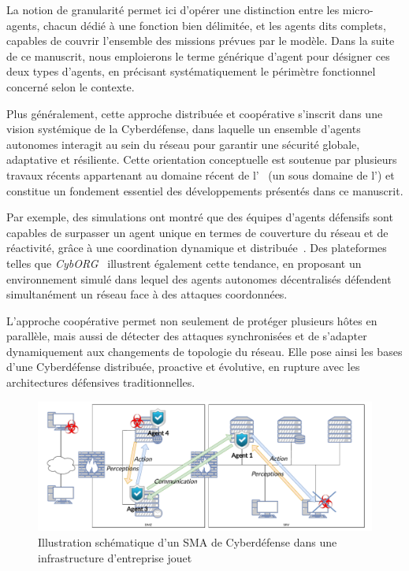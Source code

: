 La notion de granularité permet ici d'opérer une distinction entre les micro-agents, chacun dédié à une fonction bien délimitée, et les agents  dits complets, capables de couvrir l'ensemble des missions prévues par le modèle. Dans la suite de ce manuscrit, nous emploierons le terme générique d'agent  pour désigner ces deux types d'agents, en précisant systématiquement le périmètre fonctionnel concerné selon le contexte.

Plus généralement, cette approche distribuée et coopérative s'inscrit dans une vision systémique de la Cyberdéfense, dans laquelle un ensemble d'agents autonomes interagit au sein du réseau pour garantir une sécurité globale, adaptative et résiliente. Cette orientation conceptuelle est soutenue par plusieurs travaux récents appartenant au domaine récent de l'~\cite{Vyas2023} (un sous domaine de l') et constitue un fondement essentiel des développements présentés dans ce manuscrit.


Par exemple, des simulations ont montré que des équipes d'agents défensifs sont capables de surpasser un agent unique en termes de couverture du réseau et de réactivité, grâce à une coordination dynamique et distribuée~\cite{RLResilientCyberdefense2024}.
Des plateformes telles que \textit{CybORG}~\cite{cage_challenge_3_announcement} illustrent également cette tendance, en proposant un environnement simulé dans lequel des agents autonomes décentralisés défendent simultanément un réseau face à des attaques coordonnées.

L'approche coopérative permet non seulement de protéger plusieurs hôtes en parallèle, mais aussi de détecter des attaques synchronisées et de s'adapter dynamiquement aux changements de topologie du réseau. Elle pose ainsi les bases d'une Cyberdéfense distribuée, proactive et évolutive, en rupture avec les architectures défensives traditionnelles.

\begin{figure}[h]
    \centering
    \includegraphics[width=\linewidth]{figures/infra_MAS_illustration.pdf}
    \caption{Illustration schématique d'un SMA de Cyberdéfense dans une infrastructure d'entreprise jouet}
    \label{fig:distributed_sma}
\end{figure}

